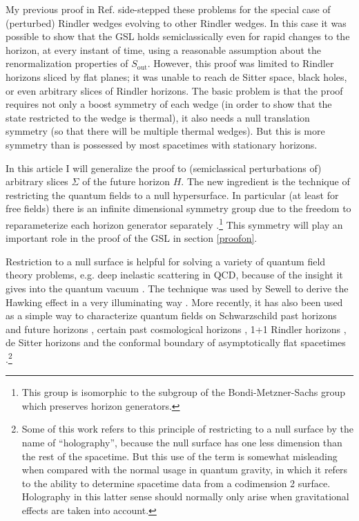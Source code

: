 \documentclass{article}
\begin{document}
My previous proof in Ref. \cite{rindler} side-stepped these problems for the special case of (perturbed) Rindler wedges evolving to other Rindler wedges.  In this case it was possible to show that the GSL holds semiclassically even for rapid changes to the horizon, at every instant of time, using a reasonable assumption about the renormalization properties of $S_\mathrm{out}$.  However, this proof was limited to Rindler horizons sliced by flat planes; it was unable to reach de Sitter space, black holes, or even arbitrary slices of Rindler horizons.  The basic problem is that the proof requires not only a boost symmetry of each wedge (in order to show that the state restricted to the wedge is thermal), it also needs a null translation symmetry (so that there will be multiple thermal wedges).  But this is more symmetry than is possessed by most spacetimes with stationary horizons.

In this article I will generalize the proof to (semiclassical perturbations of) arbitrary slices $\Sigma$ of the future horizon $H$.  The new ingredient is the technique of restricting the quantum fields to a null hypersurface.  In particular (at least for free fields) there is an infinite dimensional symmetry group due to the freedom to reparameterize each horizon generator separately \cite{schroer09}.\footnote{This group is isomorphic to the subgroup of the Bondi-Metzner-Sachs group which preserves horizon generators.}  This symmetry will play an important role in the proof of the GSL in section \ref{proofon}.

Restriction to a null surface is helpful for solving a variety of quantum field theory problems, e.g. deep inelastic scattering in QCD, because of the insight it gives into the quantum vacuum \cite{burkardt96}.  The technique was used by Sewell to derive the Hawking effect in a very illuminating way \cite{sewell82}.  More recently, it has also been used as a simple way to characterize quantum fields on Schwarzschild past horizons \cite{DMP09} and future horizons \cite{MP03}, certain past cosmological horizons \cite{DMP08}, 1+1 Rindler horizons \cite{MP04}, de Sitter horizons \cite{pinamonti05} and the conformal boundary of asymptotically flat spacetimes \cite{moretti05}.\footnote{Some of this work refers to this principle of restricting to a null surface by the name of ``holography'', because the null surface has one less dimension than the rest of the spacetime.  But this use of the term is somewhat misleading when compared with the normal usage in quantum gravity, in which it refers to the ability to determine spacetime data from a codimension 2 surface.  Holography in this latter sense should normally only arise when gravitational effects are taken into account.}
\end{document}
